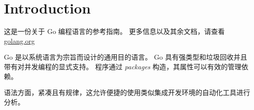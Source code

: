 
\chapter{Introduction}
这是一份关于 Go 编程语言的参考指南。
更多信息以及其余文档，请查看 \href{golang.org}{golang.org}

Go 是以系统语言为宗旨而设计的通用目的语言。
Go 具有强类型和垃圾回收并且带有对并发编程的显式支持。
程序通过 \emph{packages} 构造，其属性可以有效的管理依赖。

语法方面，紧凑且有规律，这允许便捷的使用类似集成开发环境的自动化工具进行分析。